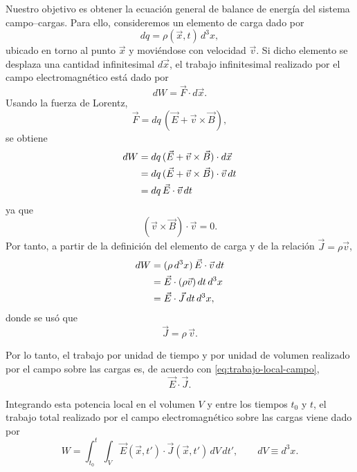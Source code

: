 \documentclass[12pt,a4paper]{article}
\theoremstyle{definition}
\theoremstyle{plain}
\numberwithin{equation}{section}
\theoremstyle{remark}
\newcommand{\E}{\vec{E}}
\newcommand{\B}{\vec{B}}
\newcommand{\J}{\vec{J}}
\newcommand{\F}{\vec{F}}
\begin{document}
Nuestro objetivo es obtener la ecuación general de balance de energía del sistema campo--cargas. Para ello, consideremos un elemento de carga dado por
\begin{equation*}
    dq=\rho(\vec x,t)\,d^3x,
\end{equation*}
ubicado en torno al punto $\vec x$ y moviéndose con velocidad $\vec v$. Si dicho elemento se desplaza una cantidad infinitesimal $d\vec x$, el trabajo infinitesimal realizado por el campo electromagnético está dado por
\begin{equation*}
    dW=\F\cdot d\vec x.
\end{equation*}
Usando la fuerza de Lorentz,
\begin{equation*}
    \F=dq\,(\E+\vec v\times\B),
\end{equation*}
se obtiene
\begin{align*}
    dW
    &=dq\,(\E+\vec v\times\B)\cdot d\vec x \notag\\
    &=dq\,(\E+\vec v\times\B)\cdot \vec v\,dt \notag\\
    &=dq\,\E\cdot \vec v\,dt
\end{align*}
ya que
\begin{equation*}
    (\vec v\times\B)\cdot \vec v=0.
\end{equation*}
Por tanto, a partir de la definición del elemento de carga y de la relación $\J=\rho\vec v$,
\begin{align}
    dW
    &= (\rho\,d^3x)\,\E\cdot\vec v\,dt \notag\\
    &= \E\cdot(\rho\vec v)\,dt\,d^3x \notag\\
    &= \E\cdot\J\,dt\,d^3x,
    \label{eq:trabajo-local-campo}
\end{align}
donde se usó que
\begin{equation*}
    \J=\rho\,\vec v.
\end{equation*}

Por lo tanto, el trabajo por unidad de tiempo y por unidad de volumen realizado por el campo sobre las cargas es, de acuerdo con \eqref{eq:trabajo-local-campo},
\begin{equation*}
    \E\cdot\J.
\end{equation*}

Integrando esta potencia local en el volumen $V$ y entre los tiempos $t_0$ y $t$, el trabajo total realizado por el campo electromagnético sobre las cargas viene dado por
\begin{equation*}
    W=\int_{t_0}^{t}\int_V \E(\vec x,t')\cdot\J(\vec x,t')\,dV\,dt',
    \qquad dV\equiv d^3x.
\end{equation*}
\end{document}
